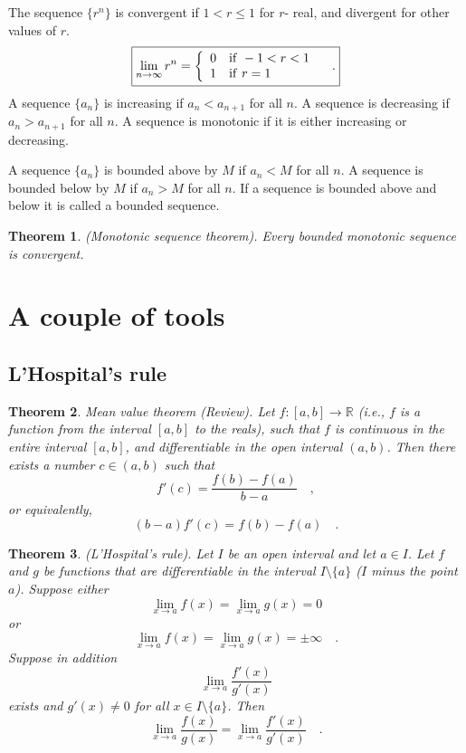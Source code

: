 \documentclass[12pt]{book}
\newtheorem{theorem}{Theorem}[section]
\begin{document}
The sequence $\{r^n\}$ is convergent if $1< r\leq 1$ for $r$- real, and divergent for other values of $r$.
\begin{equation}\boxed{\label{eqLimitRtoTheNth}
\lim\limits_{n\to \infty}r^n= \left\{\begin{array}{ll} 0 & \mathrm{if~} -1<r<1\\ 1& \mathrm{if~} r=1\end{array} \right.\quad .
}
\end{equation}
A sequence $\{a_n\}$ is increasing if $a_n<a_{n+1}$ for all $n$. A sequence is decreasing if $a_n>a_{n+1}$ for all $n$. A sequence is monotonic if it is either increasing or decreasing.   

A sequence $\{a_n\}$ is bounded above by $M$ if $a_n<M$ for all $n$. A sequence is bounded below by $M$ if $a_n>M$ for all $n$. If a sequence is bounded above and below it is called a bounded sequence. 

\begin{theorem}\label{thMonotonicSequenceThereom}
 (Monotonic sequence theorem). Every bounded monotonic sequence is convergent.
\end{theorem}
\section{A couple of tools}
\subsection{L'Hospital's rule}
\begin{theorem}
 Mean value theorem (Review). Let $f:[a,b]\to \mathbb R$ (i.e., $f$ is a function from the interval $[a,b]$ to the reals), such that $f$ is continuous in the entire interval $[a,b]$, and differentiable in the open interval $(a,b)$. Then there exists a number $c\in (a,b)$ such that
\[
f'(c)=\frac{f(b)-f(a)}{b-a}\quad,
\]
or equivalently,
\[
(b-a)f'(c)=f(b)-f(a)\quad .
\]
\end{theorem}

\begin{theorem} 
(L'Hospital's rule). Let $I$ be an open interval and let $a\in I$. Let $f$ and $g$ be functions that are differentiable in the interval $I\setminus \{a\}$ ($I$ minus the point $a$). Suppose either
\[
\lim_{x\to a} f(x)= \lim_{x\to a}g(x)=0
\]
or
\[
\lim_{x\to a} f(x)= \lim_{x\to a}g(x)=\pm \infty\quad .
\]
Suppose in addition
\[
\lim_{x\to a} \frac{f'(x)}{g'(x)}
\]
exists and $g'(x)\neq 0$ for all $x\in I\setminus \{a\}$. Then
\[
\lim_{x\to a}\frac{f(x)}{g(x)}= \lim_{x\to a} \frac{f'(x)}{g'(x)}\quad .
\]
\end{theorem}
\end{document}
